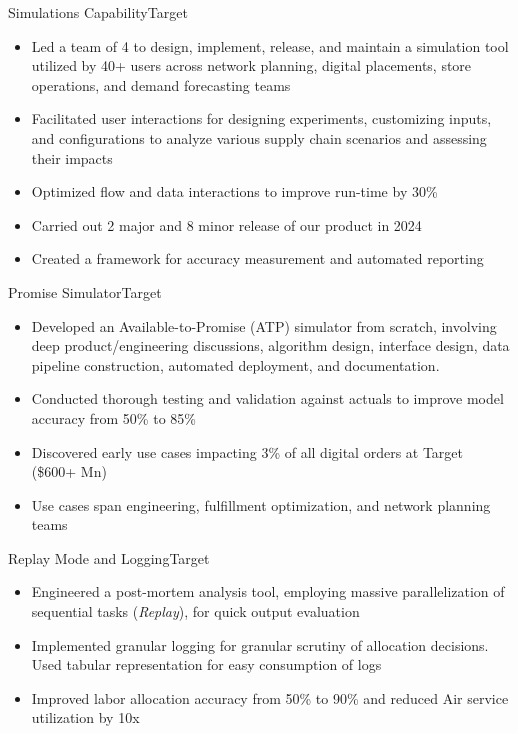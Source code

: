 \documentclass[11pt,a4paper,]{moderncv}
\begin{document}
\nopagebreak
    {Simulations Capability}{Target}{}{}{
    \begin{itemize}
        \item Led a team of 4 to design, implement, release, and maintain a simulation tool utilized by 40+ users across network planning, digital placements, store operations, and demand forecasting teams
        \item Facilitated user interactions for designing experiments, customizing inputs, and configurations to analyze various supply chain scenarios and assessing their impacts
        \item Optimized flow and data interactions to improve run-time by 30\%
        \item Carried out 2 major and 8 minor release of our product in 2024
        \item Created a framework for accuracy measurement and automated reporting
    \end{itemize}
    }
    {Promise Simulator}{Target}{}{}{
    \begin{itemize}
        \item Developed an Available-to-Promise (ATP) simulator from scratch, involving deep product/engineering discussions, algorithm design, interface design, data pipeline construction, automated deployment, and documentation. 
        \item Conducted thorough testing and validation against actuals to improve model accuracy from 50\% to 85\%
        \item Discovered early use cases impacting 3\% of all digital orders at Target (\$600+ Mn)
        \item Use cases span engineering, fulfillment optimization, and network planning teams
    \end{itemize}
    }
    {Replay Mode and Logging}{Target}{}{}{
    \begin{itemize}
        \item Engineered a post-mortem analysis tool, employing massive parallelization of sequential tasks (\emph{Replay}), for quick output evaluation
        \item Implemented granular logging for granular scrutiny of allocation decisions. Used tabular representation for easy consumption of logs
        \item Improved labor allocation accuracy from 50\% to 90\% and reduced Air service utilization by 10x
    \end{itemize}
    }
\end{document}
